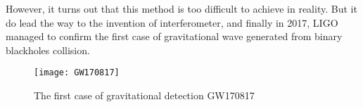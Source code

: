 \documentclass[10pt]{article}
\begin{document}
However, it turns out that this method is too difficult to achieve in reality. But it do lead the way to the invention of interferometer, and finally in 2017, LIGO managed to confirm the first case of gravitational wave generated from binary blackholes collision.
\begin{figure}
	\centering
	\texttt{[image: GW170817]}
	\caption{The first case of gravitational detection GW170817}
	\label{fig:gw170817}
\end{figure}
\end{document}
